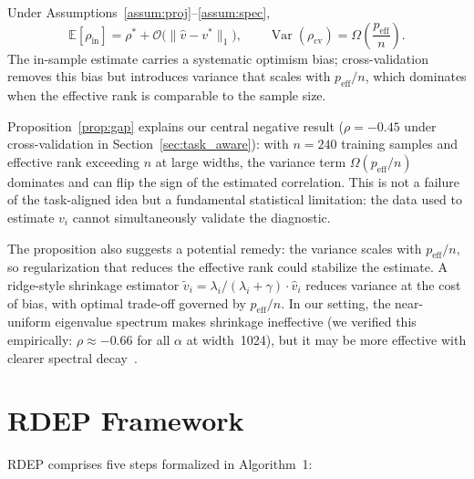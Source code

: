 \documentclass[twoside,11pt]{article}
\begin{document}
\begin{proposition}
\label{prop:gap}
Under Assumptions~\ref{assum:proj}--\ref{assum:spec},
\[
\mathbb{E}[\rho_{\text{in}}] = \rho^* + \mathcal{O}\bigl(\|\hat{v} - v^*\|_1\bigr),\qquad
\operatorname{Var}(\rho_{\text{cv}}) = \Omega\!\left(\frac{p_{\text{eff}}}{n}\right).
\]
The in-sample estimate carries a systematic optimism bias; cross-validation removes this bias but introduces variance that scales with $p_{\text{eff}} / n$, which dominates when the effective rank is comparable to the sample size.
\end{proposition}

Proposition~\ref{prop:gap} explains our central negative result ($\rho=-0.45$ under cross-validation in Section~\ref{sec:task_aware}): with $n=240$ training samples and effective rank exceeding $n$ at large widths, the variance term $\Omega(p_{\text{eff}}/n)$ dominates and can flip the sign of the estimated correlation. This is not a failure of the task-aligned idea but a fundamental statistical limitation: the data used to estimate $v_i$ cannot simultaneously validate the diagnostic.

The proposition also suggests a potential remedy: the variance scales with $p_{\text{eff}}/n$, so regularization that reduces the effective rank could stabilize the estimate. A ridge-style shrinkage estimator $\tilde{v}_i = \lambda_i / (\lambda_i + \gamma) \cdot \hat{v}_i$ reduces variance at the cost of bias, with optimal trade-off governed by $p_{\text{eff}}/n$. In our setting, the near-uniform eigenvalue spectrum makes shrinkage ineffective (we verified this empirically: $\rho \approx -0.66$ for all $\alpha$ at width~1024), but it may be more effective with clearer spectral decay~\citep{canatar2021spectral}.

\section{RDEP Framework}

RDEP comprises five steps formalized in Algorithm~1:
\end{document}
